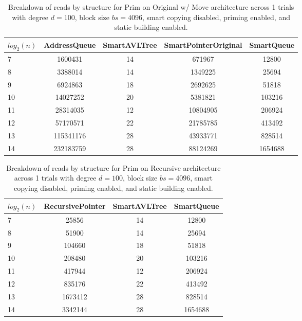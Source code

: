 \begin{table}[]
\centering
\begin{tabular}{|l|c|c|c|c|}
$log_2(n)$ & AddressQueue & SmartAVLTree & SmartPointerOriginal & SmartQueue \\ \hline
7 & 1600431 & 14 & 671967 & 12800 \\ \hline
8 & 3388014 & 14 & 1349225 & 25694 \\ \hline
9 & 6924863 & 18 & 2692625 & 51818 \\ \hline
10 & 14027252 & 20 & 5381821 & 103216 \\ \hline
11 & 28314035 & 12 & 10804905 & 206924 \\ \hline
12 & 57170571 & 22 & 21785785 & 413492 \\ \hline
13 & 115341176 & 28 & 43933771 & 828514 \\ \hline
14 & 232183759 & 28 & 88124269 & 1654688 \\ \hline
\end{tabular}
\caption{Breakdown of reads by structure for Prim on Original w/ Move architecture across 1 trials with degree $d=100$, block size $bs=4096$, smart copying disabled, priming enabled, and static building enabled.}
    \label{tab:reads_by_structure_prim_d100_bs4096_trials1_copiesfalse_primetrue_staticinsertiontrue_ptoriginal_movetrue}
\end{table}

\begin{table}[]
\centering
\begin{tabular}{|l|c|c|c|}
$log_2(n)$ & RecursivePointer & SmartAVLTree & SmartQueue \\ \hline
7 & 25856 & 14 & 12800 \\ \hline
8 & 51900 & 14 & 25694 \\ \hline
9 & 104660 & 18 & 51818 \\ \hline
10 & 208480 & 20 & 103216 \\ \hline
11 & 417944 & 12 & 206924 \\ \hline
12 & 835176 & 22 & 413492 \\ \hline
13 & 1673412 & 28 & 828514 \\ \hline
14 & 3342144 & 28 & 1654688 \\ \hline
\end{tabular}
\caption{Breakdown of reads by structure for Prim on Recursive architecture across 1 trials with degree $d=100$, block size $bs=4096$, smart copying disabled, priming enabled, and static building enabled.}
    \label{tab:reads_by_structure_prim_d100_bs4096_trials1_copiesfalse_primetrue_staticinsertiontrue_ptrecursive_movetrue}
\end{table}


